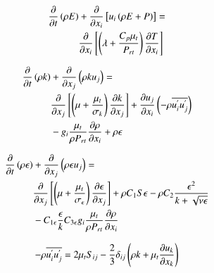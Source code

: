 \documentclass[preprint,12pt]{elsarticle}
\begin{document}
\begin{equation}
\centering
\begin{split}
\frac{\partial }{\partial t } \left( \rho E \right) &+ \frac{\partial }{\partial x_i} \left[ u_i \left( \rho E + P \right) \right] = \\
 &\frac{\partial }{\partial x_i } \left[ \left( \lambda + \frac{C_p \mu_t }{P_{rt}} \right) \frac{\partial T}{\partial x_i} \right] 
\label{eq:energy}
\end{split}
\end{equation}

\begin{equation}
\centering
\begin{split}
\frac{\partial }{\partial t} \left(\rho k \right) &+ \frac{\partial }{\partial x_j} \left( \rho k u_j \right) = \\
&\frac{\partial }{\partial x_j} \left[ \left( \mu + \frac{\mu_t}{\sigma_k} \right) \frac{\partial k}{\partial x_j} \right] + \frac{\partial u_j}{\partial x_i} \left( -\rho \overline{u^{'}_{i} u^{'}_{j}} \right) \\
&- g_i \frac{\mu_t}{\rho P_{rt}} \frac{\partial \rho }{\partial x_i} + \rho \epsilon
\label{eq:k}
\end{split}
\end{equation}

\begin{equation}
\centering
\begin{split}
 \frac{\partial }{\partial t} \left(\rho \epsilon \right) &+ \frac{\partial }{\partial x_j} \left( \rho \epsilon u_j \right) = \\
 &\frac{\partial }{\partial x_j } \left[ \left( \mu + \frac{\mu_t }{\sigma_\epsilon } \right) \frac{\partial \epsilon }{\partial x_j } \right] + \rho C_1 S \epsilon - \rho C_2 \frac{\epsilon^2 }{k+\sqrt{\nu \epsilon}} \\
 &- C_{1 \epsilon} \frac{\epsilon}{k} C_{3\epsilon} g_i \frac{\mu_t}{\rho P_{rt}} \frac{\partial \rho}{\partial x_i}
\label{eq:e}
\end{split}
\end{equation}

\begin{equation}
\centering
- \rho \overline{u^{'}_{i} u^{'}_{j}} = 2\mu_t S_{ij} - \frac{2}{3} \delta_{ij} \left( \rho k + \mu_t \frac{\partial u_k}{\partial x_k} \right)
\label{eq:reynoldsstress}
\end{equation}
\end{document}
